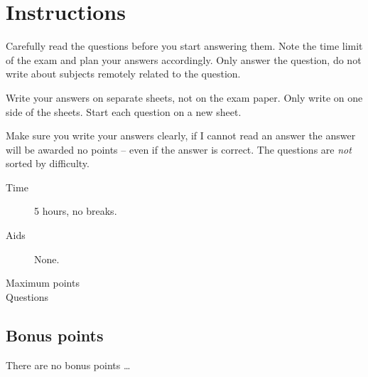 \documentclass[a4paper,addpoints]{miunexam}
\date{2011-10-21}
\author{%
	Lennart Franked\\
  {\small\em E-post:} \texttt{\small lennart.franked@miun.se}\\
	{\small\em Telefon: 060-14\,xxxx}
	\and
	Daniel Bosk\\
  {\small\em E-post:} \texttt{\small daniel.bosk@miun.se}\\
	{\small\em Telefon: 060-14\,8709}
	\and
	Ulf Jennehag\\
  {\small\em E-post:} \texttt{\small ulf.jennehag@miun.se}\\
	{\small\em Telefon: 060-14\,xxxx}
	\and
	Martin Kjellqvist\\
  {\small\em E-post:} \texttt{\small martin.kjellqvist@miun.se}\\
	{\small\em Telefon: 060-14\,xxxx}
}
\begin{document}
\lstset{style=code,language=python}

\maketitle
\thispagestyle{foot}

\section*{Instructions}
\label{sec:Instructions}
\noindent
Carefully read the questions before you start answering them.
Note the time limit of the exam and plan your answers accordingly.
Only answer the question, do not write about subjects remotely related to the
question.

Write your answers on separate sheets, not on the exam paper.
Only write on one side of the sheets.
Start each question on a new sheet.

Make sure you write your answers clearly, if I cannot read an answer the answer
will be awarded no points -- even if the answer is correct.
The questions are \emph{not} sorted by difficulty.

\begin{description}
	\item[Time] 5 hours, no breaks.
	\item[Aids] None.
	\item[Maximum points] \numpoints
	\item[Questions] \numquestions
\end{description}

\subsection*{Bonus points}
\noindent
There are no bonus points \dots
\end{document}
